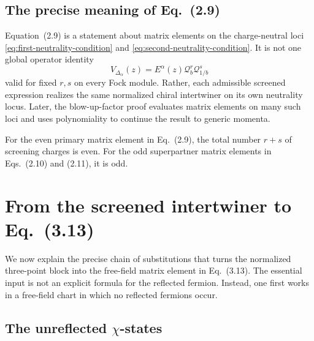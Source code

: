 \documentclass[11pt]{article}
\begin{document}
\subsection{The precise meaning of Eq.~(2.9)}

Equation~(2.9) is a statement about matrix elements on the charge-neutral
loci \eqref{eq:first-neutrality-condition} and
\eqref{eq:second-neutrality-condition}.  It is not one global operator
identity
\begin{equation}
 V_{\Delta_\alpha}(z)
 =
 E^\alpha(z)\mathcal Q_b^r\mathcal Q_{1/b}^s
 \label{eq:not-global-operator-identity}
\end{equation}
valid for fixed \(r,s\) on every Fock module.  Rather, each admissible
screened expression realizes the same normalized chiral intertwiner on its
own neutrality locus.  Later, the blow-up-factor proof evaluates matrix
elements on many such loci and uses polynomiality to continue the result to
generic momenta.

For the even primary matrix element in Eq.~(2.9), the total number \(r+s\)
of screening charges is even.  For the odd superpartner matrix elements in
Eqs.~(2.10) and (2.11), it is odd.

\section{From the screened intertwiner to Eq.~(3.13)}

We now explain the precise chain of substitutions that turns the normalized
three-point block into the free-field matrix element in Eq.~(3.13).  The
essential input is not an explicit formula for the reflected fermion.
Instead, one first works in a free-field chart in which no reflected
fermions occur.

\subsection{The unreflected \texorpdfstring{\(\chi\)}{chi}-states}
\end{document}
